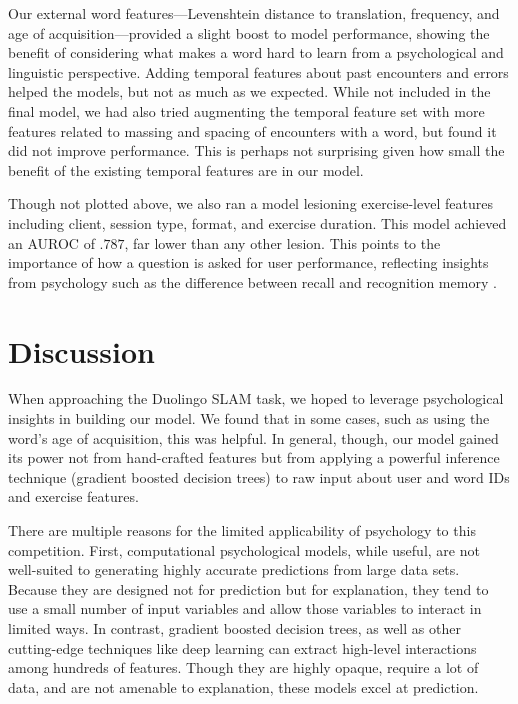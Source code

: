 \documentclass[11pt,a4paper]{article}
\begin{document}
Our external word features---Levenshtein distance to translation, frequency, and
age of acquisition---provided a slight boost to model performance, showing the
benefit of considering what makes a word hard to learn from a psychological and
linguistic perspective. Adding temporal features about past encounters and
errors helped the models, but not as much as we expected. While not included in
the final model, we had also tried augmenting the temporal feature set with more
features related to massing and spacing of encounters with a word, but found it
did not improve performance. This is perhaps not surprising given how small the
benefit of the existing temporal features are in our model.

Though not plotted above, we also ran a model lesioning exercise-level features
including client, session type, format, and exercise duration. This model
achieved an AUROC of $.787$, far lower than any other lesion. This points to the
importance of how a question is asked for user performance, reflecting insights
from psychology such as the difference between recall and recognition memory
\cite{yonelinas2002nature}.

\section{Discussion}

When approaching the Duolingo SLAM task, we hoped to leverage psychological
insights in building our model. We found that in some cases, such as using the
word's age of acquisition, this was helpful. In general, though, our model gained its
power not from hand-crafted features but from applying a powerful inference
technique (gradient boosted decision trees) to raw input about user and word IDs and
exercise features.

There are multiple reasons for the limited applicability of psychology to this
competition. First, computational psychological models, while useful, are not
well-suited to generating highly accurate predictions from large data sets.
Because they are designed not for prediction but for explanation, they tend to
use a small number of input variables and allow those variables to interact
in limited ways. In contrast, gradient boosted decision trees, as well as other
cutting-edge techniques like deep learning can extract high-level
interactions among hundreds of features. Though they are highly opaque, require
a lot of data, and are not amenable to explanation, these models excel at prediction.
\end{document}
